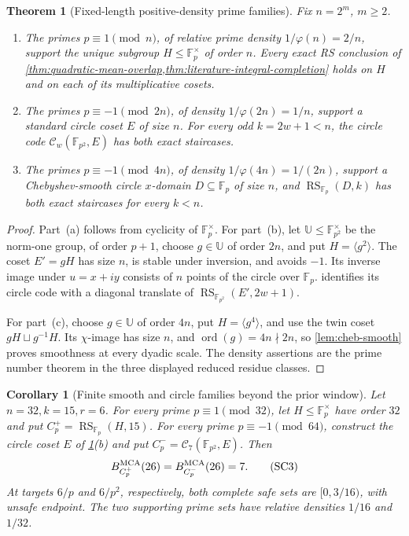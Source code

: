 \documentclass[11pt,a4paper]{amsart}
\numberwithin{equation}{section}
\newtheorem{theorem}{Theorem}[section]
\newtheorem{corollary}[corollary]{Corollary}
\theoremstyle{remark}
\DeclareMathOperator{\RS}{RS}
\DeclareMathOperator{\ord}{ord}
\newcommand{\F}{\mathbb F}
\newcommand{\Ccal}{\mathcal C}
\newcommand{\UU}{\mathbb U}
\begin{document}
\begin{theorem}[Fixed-length positive-density prime families]
\label{thm:fixed-length-prime-density}
Fix \(n=2^m\), \(m\ge2\).
\begin{enumerate}[label=\textup{(\alph*)},leftmargin=*]
\item The primes \(p\equiv1\pmod n\), of relative prime density
\(1/\varphi(n)=2/n\), support the unique subgroup
\(H\le\F_p^\times\) of order \(n\).  Every exact RS conclusion of
\cref{thm:quadratic-mean-overlap,thm:literature-integral-completion}
holds on \(H\) and on each of its multiplicative cosets.
\item The primes \(p\equiv-1\pmod {2n}\), of density
\(1/\varphi(2n)=1/n\), support a standard circle coset \(E\) of size
\(n\).  For every odd \(k=2w+1<n\), the circle code
\(\Ccal_w(\F_{p^2},E)\) has both exact staircases.
\item The primes \(p\equiv-1\pmod {4n}\), of density
\(1/\varphi(4n)=1/(2n)\), support a Chebyshev-smooth circle
\(x\)-domain \(D\subseteq\F_p\) of size \(n\), and
\(\RS_{\F_p}(D,k)\) has both exact staircases for every \(k<n\).
\end{enumerate}
\end{theorem}

\begin{proof}
Part~\textup{(a)} follows from cyclicity of \(\F_p^\times\).  For
part~\textup{(b)}, let \(\UU\le\F_{p^2}^\times\) be the norm-one group,
of order \(p+1\), choose \(g\in\UU\) of order \(2n\), and put
\(H=\langle g^2\rangle\).  The coset \(E'=gH\) has size \(n\), is
stable under inversion, and avoids \(-1\).  Its inverse image under
\(u=x+iy\) consists of \(n\) points of the circle over \(\F_p\).
 identifies its circle code with a
diagonal translate of \(\RS_{\F_{p^2}}(E',2w+1)\).

For part~\textup{(c)}, choose \(g\in\UU\) of order \(4n\), put
\(H=\langle g^4\rangle\), and use the twin coset
\(gH\sqcup g^{-1}H\).  Its \(\chi\)-image has size \(n\), and
\(\ord(g)=4n\nmid2n\), so \cref{lem:cheb-smooth} proves smoothness at
every dyadic scale.  The density assertions are the prime number theorem
in the three displayed reduced residue classes.
\end{proof}

\begin{corollary}[Finite smooth and circle families beyond the prior window]
\label{cor:circle-32-family}
Let \(n=32,k=15,r=6\).  For every prime
\(p\equiv1\pmod {32}\), let \(H\le\F_p^\times\) have order \(32\)
and put \(C_p^+=\RS_{\F_p}(H,15)\).  For every prime
\(p\equiv-1\pmod {64}\), construct the circle coset \(E\) of
\cref{thm:fixed-length-prime-density}\textup{(b)} and put
\(C_p^-=\Ccal_7(\F_{p^2},E)\).  Then
\[
 B_{C_p^+}^{\rm MCA}(26)=B_{C_p^-}^{\rm MCA}(26)=7. \tag{SC3}
\]
At targets \(6/p\) and \(6/p^2\), respectively, both complete safe
sets are \([0,3/16)\), with unsafe endpoint.  The two supporting prime
sets have relative densities \(1/16\) and \(1/32\).
\end{corollary}
\end{document}
